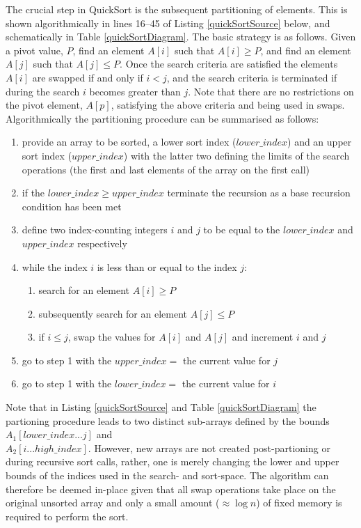 \documentclass[12pt,a4paper]{article}
\begin{document}
The crucial step in QuickSort is the subsequent partitioning of elements. This is shown algorithmically in lines 16--45 of Listing \ref{quickSortSource} below, and schematically in Table \ref{quickSortDiagram}. The basic strategy is as follows. Given a pivot value, $P$, find an element $A[i]$ such that $A[i] \geq P$, and find an element $A[j]$ such that $A[j] \leq P$. Once the search criteria are satisfied the elements $A[i]$ are swapped if and only if $i < j$, and the search criteria is terminated if during the search $i$ becomes greater than $j$. Note that there are no restrictions on the pivot element, $A[p]$, satisfying the above criteria and being used in swaps. Algorithmically the partitioning procedure can be summarised as follows:

\begin{enumerate}
\item provide an array to be sorted, a lower sort index ($lower\_index$) and an upper sort index ($upper\_index$) with the latter two defining the limits of the search operations (the first and last elements of the array on the first call)
\item if the $lower\_index \geq upper\_index$ terminate the recursion as a base recursion condition has been met
\item define two index-counting integers $i$ and $j$ to be equal to the $lower\_index$ and $upper\_index$ respectively 
\item while the index $i$ is less than or equal to the index $j$:
\begin{enumerate}
\item search for an element $A[i] \geq P$
\item subsequently search for an element $A[j] \leq P$
\item if $i \leq j$, swap the values for $A[i]$ and $A[j]$ and increment $i$ and $j$
\end{enumerate}
\item go to step 1 with the $upper\_index =$ the current value for $j$ 
\item go to step 1 with the $lower\_index =$ the current value for $i$ 
\end{enumerate}

Note that in Listing \ref{quickSortSource} and Table \ref{quickSortDiagram} the partioning procedure leads to two distinct sub-arrays defined by the bounds $A_1[lower\_index ... j]$ and \\ $A_2[i...high\_index]$. However, new arrays are not created post-partioning or during recursive sort calls, rather, one is merely changing the lower and upper bounds of the indices used in the search- and sort-space. The algorithm can therefore be deemed in-place given that all swap operations take place on the original unsorted array and only a small amount ($\approx \log n$) of fixed memory is required to perform the sort.
\end{document}
